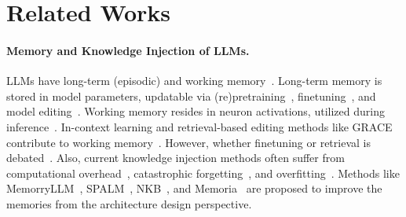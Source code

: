 \documentclass{article}
\begin{document}
\section{Related Works}\label{sec:related_works}
\paragraph{Memory and Knowledge Injection of LLMs.}
LLMs have long-term (episodic) and working memory~\cite{llm_controllable_working_memory,memoria,spalm}. Long-term memory is stored in model parameters, updatable via (re)pretraining~\cite{gpt-1}, finetuning~\cite{lora}, and model editing~\cite{knowledge_editing_survey_1}. Working memory resides in neuron activations, utilized during inference~\cite{llm_controllable_working_memory}. In-context learning and retrieval-based editing methods like GRACE contribute to working memory~\cite{chain_of_thoughts,grace}. However, whether finetuning or retrieval is debated~\cite{ft_vs_rag,fewshotft_vs_icl}. Also, current knowledge injection methods often suffer from computational overhead~\cite{llama-2,grace}, catastrophic forgetting~\cite{catastrophic_forgetting_llm}, and overfitting~\cite{memorization_overfitting}. Methods like MemorryLLM~\cite{memoryllm}, SPALM~\cite{spalm}, NKB~\cite{knowledge_bank}, and Memoria~\cite{memoria} are proposed to improve the memories from the architecture design perspective.
\end{document}
